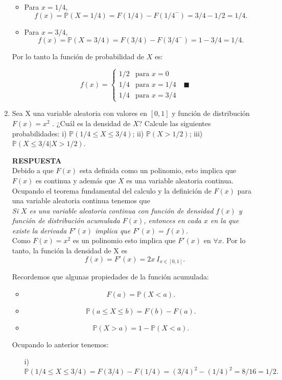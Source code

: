 \documentclass[11pt,letterpaper]{article}
\newcommand{\mP}{\mathbb{P}}
\newcommand{\res}{\textbf{RESPUESTA}\\}
\begin{document}
\begin{enumerate}
\begin{itemize}
\item Para $x=1/4$,
$$ f(x)= \mP(X=1/4)= F(1/4)-F({1/4}^-)=3/4-1/2=1/4.$$

\item Para $x=3/4$,
$$ f(x)= \mP(X=3/4)= F(3/4)-F({3/4}^-)=1-3/4=1/4.$$
\end{itemize}
Por lo tanto la función de probabilidad de $X$ es: 

\begin{equation*}
f(x) = \left\{\begin{array}{ll}
1/2 & \text{para } x=0\\
1/4 & \text{para } x =1/4\\
1/4 & \text{para } x=3/4
\end{array} \right.\ \ \ \blacksquare
\end{equation*}

\item Sea X una variable aleatoria con valores en $[0, 1]$ y función de distribución $F(x)=x^2$ . ¿Cuál es
la densidad de $X$? Calcule las siguientes probabilidades: i) $\mP (1/4 \leq X \leq 3/4)$; ii) $\mP (X > 1/2)$;
iii) $\mP (X \leq 3/4|X > 1/2)$.

\res
Debido a que $F(x)$ esta definida como un polinomio, esto implica que $F(x)$ es continua y además que $X$ es una variable aleatoria continua. Ocupando el teorema fundamental del calculo y la definición de $F(x)$ para una variable aleatoria continua tenemos que\\ 

\textit{Si $X$ es una variable aleatoria continua con función de densidad $f(x)$ y función de distribución acumulada $F(x)$, entonces en cada $x$ en la que existe la derivada $F'(x)$ implica que $F'(x)=f(x).$}\\

Como $F(x)=x^2$ es un polinomio esto implica que $F'(x)$ en $\forall x$. Por lo tanto, la función la densidad de X es
$$f(x)=F'(x)=2x \ I_{x\in [0,1]}.$$

Recordemos que algunas propiedades de la función acumulada:
\begin{itemize}
\item $$F(a)=\mP(X<a).$$
\item $$\mP (a\leq X\leq b)= F(b)-F(a). $$
\item $$\mP(X>a)=1-\mP(X<a).$$
\end{itemize}
Ocupando lo anterior tenemos:

\begin{itemize}
\item[i)] 
$$\mP (1/4 \leq X \leq 3/4)= F(3/4)-F(1/4)= (3/4)^2-(1/4)^2=8/16=1/2.$$ 


\end{itemize}
\end{enumerate}
\end{document}

